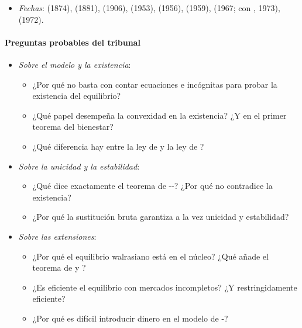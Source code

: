 \documentclass[11pt]{article}
\begin{document}
\begin{itemize}
\begin{itemize}
\begin{itemize}
    \item SMD (1972-1974).
    \end{itemize}
  \item \emph{Teoremas del bienestar}: el primero no necesita convexidad; el segundo, sí.
  \item \emph{Núcleo}: el equilibrio walrasiano está en el núcleo; con réplicas, el núcleo converge al equilibrio ( y , 1963; , 1964, con un continuo de agentes).
  \end{itemize}
\item \emph{Fechas}:  (1874),  (1881),  (1906),  (1953),  (1956),  (1959),  (1967; con , 1973),  (1972).
\end{itemize}

\paragraph{Preguntas probables del tribunal}

\begin{itemize}
\item \emph{Sobre el modelo y la existencia}:
  \begin{itemize}
  \item ¿Por qué no basta con contar ecuaciones e incógnitas para probar la existencia del equilibrio?
  \item ¿Qué papel desempeña la convexidad en la existencia? ¿Y en el primer teorema del bienestar?
  \item ¿Qué diferencia hay entre la ley de  y la ley de ?
  \end{itemize}
\item \emph{Sobre la unicidad y la estabilidad}:
  \begin{itemize}
  \item ¿Qué dice exactamente el teorema de --? ¿Por qué no contradice la existencia?
  \item ¿Por qué la sustitución bruta garantiza a la vez unicidad y estabilidad?
  \end{itemize}
\item \emph{Sobre las extensiones}:
  \begin{itemize}
  \item ¿Por qué el equilibrio walrasiano está en el núcleo? ¿Qué añade el teorema de  y ?
  \item ¿Es eficiente el equilibrio con mercados incompletos? ¿Y restringidamente eficiente?
  \item ¿Por qué es difícil introducir dinero en el modelo de -?
  \end{itemize}
\end{itemize}

\nocite{ICEXCECO3A21}
\bibliografia
\end{document}
